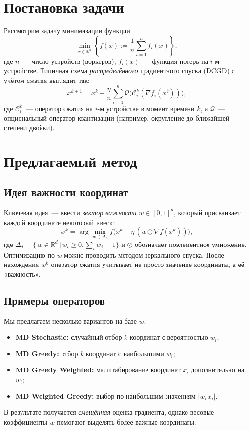 \documentclass{article}
\begin{document}
\section{Постановка задачи}
Рассмотрим задачу минимизации функции
\begin{equation}
  \label{eq:distributed_optimization}
  \min_{x \in \mathbb{R}^d}\left\{f(x) := \frac{1}{n}\sum\limits_{i = 1}^n f_i(x) \right\},
\end{equation}
где $n$~--- число устройств (воркеров), $f_i(x)$~--- функция потерь на $i$-м устройстве. Типичная схема \emph{распределённого} градиентного спуска (DCGD) с учётом сжатия выглядит так:
\begin{equation}
  x^{k+1} = x^k - \frac{\eta}{n} \sum_{i=1}^n \mathcal{Q}\bigl(\mathcal{C}_i^k(\nabla f_i(x^k))\bigr),
\end{equation}
где $\mathcal{C}_i^k$~--- оператор сжатия на $i$-м устройстве в момент времени $k$, а $\mathcal{Q}$~--- опциональный оператор квантизации (например, округление до ближайшей степени двойки).
\section{Предлагаемый метод}
\subsection{Идея важности координат}
Ключевая идея~--- ввести \emph{вектор важности} $w \in [0, 1]^d$, который присваивает каждой координате некоторый «вес»:
\[
  w^k = \arg\min_{w \in \Delta_d} f\bigl(x^k - \eta\, (w \odot \nabla f(x^k))\bigr),
\]
где $\Delta_d = \{\, w \in \mathbb{R}^d \,\vert\, w_i \ge 0, \sum_i w_i = 1 \}$ и $\odot$ обозначает поэлементное умножение. Оптимизацию по $w$ можно проводить методом зеркального спуска. После нахождения $w^k$ оператор сжатия учитывает не просто значение координаты, а её «важность».

\subsection{Примеры операторов}
Мы предлагаем несколько вариантов на базе $w$:
\begin{itemize}
\item \textbf{MD Stochastic:} случайный отбор $k$ координат с вероятностью $w_i$;
\item \textbf{MD Greedy:} отбор $k$ координат с наибольшими $w_i$;
\item \textbf{MD Greedy Weighted:} масштабирование координат $x_i$ дополнительно на $w_i$;
\item \textbf{MD Weighted Greedy:} выбор по наибольшим значениям $|w_i \, x_i|$.
\end{itemize}
В результате получается \emph{смещённая} оценка градиента, однако весовые коэффициенты $w$ помогают выделять более важные координаты.
\end{document}
